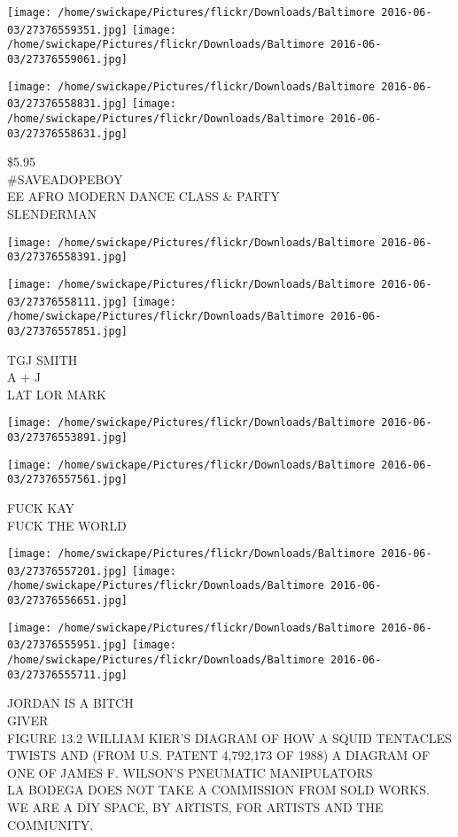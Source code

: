 \documentclass[10pt,letterpaper]{article}
\begin{document}
\texttt{[image: /home/swickape/Pictures/flickr/Downloads/Baltimore 2016-06-03/27376559351.jpg]}
\texttt{[image: /home/swickape/Pictures/flickr/Downloads/Baltimore 2016-06-03/27376559061.jpg]}

\texttt{[image: /home/swickape/Pictures/flickr/Downloads/Baltimore 2016-06-03/27376558831.jpg]}
\texttt{[image: /home/swickape/Pictures/flickr/Downloads/Baltimore 2016-06-03/27376558631.jpg]}

\$5.95\\
\#SAVEADOPEBOY\\
EE AFRO MODERN DANCE CLASS \& PARTY\\
SLENDERMAN\\
\pagebreak

\texttt{[image: /home/swickape/Pictures/flickr/Downloads/Baltimore 2016-06-03/27376558391.jpg]}

\vspace{0.25in}
\texttt{[image: /home/swickape/Pictures/flickr/Downloads/Baltimore 2016-06-03/27376558111.jpg]}
\texttt{[image: /home/swickape/Pictures/flickr/Downloads/Baltimore 2016-06-03/27376557851.jpg]}

TGJ SMITH\\
A + J\\
LAT LOR MARK\\
\pagebreak

\texttt{[image: /home/swickape/Pictures/flickr/Downloads/Baltimore 2016-06-03/27376553891.jpg]}

\vspace{0.25in}
\texttt{[image: /home/swickape/Pictures/flickr/Downloads/Baltimore 2016-06-03/27376557561.jpg]}

FUCK KAY\\
FUCK THE WORLD\\
\pagebreak

\texttt{[image: /home/swickape/Pictures/flickr/Downloads/Baltimore 2016-06-03/27376557201.jpg]}
\texttt{[image: /home/swickape/Pictures/flickr/Downloads/Baltimore 2016-06-03/27376556651.jpg]}

\texttt{[image: /home/swickape/Pictures/flickr/Downloads/Baltimore 2016-06-03/27376555951.jpg]}
\texttt{[image: /home/swickape/Pictures/flickr/Downloads/Baltimore 2016-06-03/27376555711.jpg]}

JORDAN IS A BITCH\\
GIVER\\
FIGURE 13.2 WILLIAM KIER'S DIAGRAM OF HOW A SQUID TENTACLES TWISTS AND (FROM U.S. PATENT 4,792,173 OF 1988) A DIAGRAM OF ONE OF JAMES F. WILSON'S PNEUMATIC MANIPULATORS\\
LA BODEGA DOES NOT TAKE A COMMISSION FROM SOLD WORKS.  WE ARE A DIY SPACE, BY ARTISTS, FOR ARTISTS AND THE COMMUNITY.\\
\pagebreak
\end{document}
